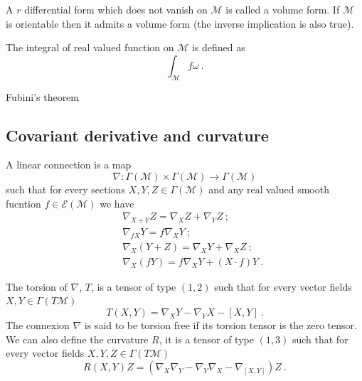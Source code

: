 \documentclass[10pt]{book}
\newcommand{\Ecal}{\mathcal{E}}
\newcommand{\Mcal}{\mathcal{M}}
\theoremstyle{break}
\begin{document}
\bigskip


A $r$ differential form which does not vanish on $\Mcal$ is called a volume form. If $\Mcal$ is orientable then it admits a volume form (the inverse implication is also true). 


\bigskip


The integral of real valued function on $\Mcal$ is defined as 
%
\begin{equation*}
\int_\Mcal f \omega \ .
\end{equation*}


\bigskip



Fubini’s theorem


\subsection{Covariant derivative and curvature}

A linear connection is a map 
%
\begin{equation*}
\nabla : \Gamma(\Mcal) \times \Gamma(\Mcal) \to \Gamma(\Mcal)  
\end{equation*}
%
such that for every sections $X, Y, Z \in \Gamma(\Mcal)$ and any real valued smooth fucntion $f \in \Ecal(\Mcal)$ we have
%
\begin{eqnarray*}
&& \nabla_{X + Y} Z = \nabla_X Z + \nabla_Y Z \ ; \\ 
&& \nabla_{f X} Y = f \nabla_X Y \ ;\\
&& \nabla_X(Y+Z) = \nabla_X Y + \nabla_X Z \ ;\\
&& \nabla_X(fY) = f \nabla_X Y + (X \cdot f) Y \ .
\end{eqnarray*}

The torsion of $\nabla$, $T$, is a tensor of type $(1,2)$ such that for every vector fields $X, Y \in \Gamma(T\Mcal)$ 
%
\begin{equation*}
T(X,Y) = \nabla_X Y - \nabla_Y X - \left[ X,Y\right] \ .
\end{equation*}
%
The connexion $\nabla$ is said to be torsion free if its torsion tensor is the zero tensor. We can also define the curvature $R$, it is a tensor of type $(1,3)$ such that for every vector fields $X, Y, Z \in \Gamma(T\Mcal)$ 
%
\begin{equation*}
R(X,Y)Z = \left( \nabla_X \nabla_Y - \nabla_Y \nabla_X - \nabla_{[X,Y]} \right) Z \ .
\end{equation*}
\end{document}
